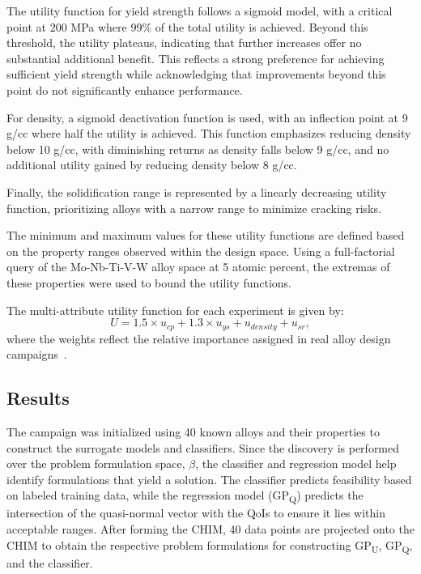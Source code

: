 \documentclass[final,5p,times,twocolumn]{elsarticle}
\begin{document}
The utility function for yield strength follows a sigmoid model, with a critical point at 200 MPa where 99\% of the total utility is achieved. Beyond this threshold, the utility plateaus, indicating that further increases offer no substantial additional benefit. This reflects a strong preference for achieving sufficient yield strength while acknowledging that improvements beyond this point do not significantly enhance performance.

For density, a sigmoid deactivation function is used, with an inflection point at 9 g/cc where half the utility is achieved. This function emphasizes reducing density below 10 g/cc, with diminishing returns as density falls below 9 g/cc, and no additional utility gained by reducing density below 8 g/cc.

Finally, the solidification range is represented by a linearly decreasing utility function, prioritizing alloys with a narrow range to minimize cracking risks.

The minimum and maximum values for these utility functions are defined based on the property ranges observed within the design space. Using a full-factorial query of the Mo-Nb-Ti-V-W alloy space at 5 atomic percent, the extremas of these properties were used to bound the utility functions.

The multi-attribute utility function for each experiment is given by:
\begin{equation}
    U = 1.5 \times u_{cp} + 1.3 \times u_{ys} + u_{density} + u_{sr},
\end{equation}
where the weights reflect the relative importance assigned in real alloy design campaigns~\cite{arpa-e_2020,acemi2024multi,hastings2024interoperable,mulukutla2024illustrating}.

\subsection{Results}
The campaign was initialized using 40 known alloys and their properties to construct the surrogate models and classifiers. Since the discovery is performed over the problem formulation space, $\beta$, the classifier and regression model help identify formulations that yield a solution. The classifier predicts feasibility based on labeled training data, while the regression model (GP\textsubscript{Q}) predicts the intersection of the quasi-normal vector with the QoIs to ensure it lies within acceptable ranges. After forming the CHIM, 40 data points are projected onto the CHIM to obtain the respective problem formulations for constructing GP\textsubscript{U}, GP\textsubscript{Q}, and the classifier.
\end{document}
